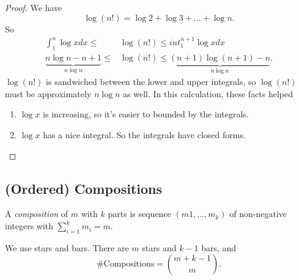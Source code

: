 \begin{proof}
    We have
    \[
        \log (n!) = \log 2 + \log 3 + \ldots + \log n.
    \]
    So
    \begin{align*}
        \int^n_1 \log x dx \leq &\log (n!)\leq int_1^{n+1}\log x dx\\
        \underbrace{n\log n - n + 1}_{n\log n} \leq &\log (n!)\leq \underbrace{(n+1)\log (n+1) - n}_{n\log n}.
    \end{align*}
    \(\log (n!)\) is sandwiched between the lower and upper integrals, so \(\log (n!)\) must be approximately \(n\log n\) as well. In this calculation, these facts helped
    \begin{enumerate}
        \item \(\log x\) is increasing, so it's easier to bounded by the integrals.
        \item \(\log x\) has a nice integral. So the integrals have closed forms.
    \end{enumerate}
\end{proof}
\subsection*{(Ordered) Compositions}
\leavevmode
\begin{definition}{}{}
    A \textit{composition} of \(m\) with \(k\) parts is sequence \((m1, \ldots , m_k )\) of non-negative integers with \(\sum\limits_{i=1}^{k} m_i = m\).
\end{definition}
We use stars and bars. There are \(m\) stars and \(k - 1\) bars, and
\[
    \#\text{Compositions} = \binom{m+k-1}{m}.
\]


